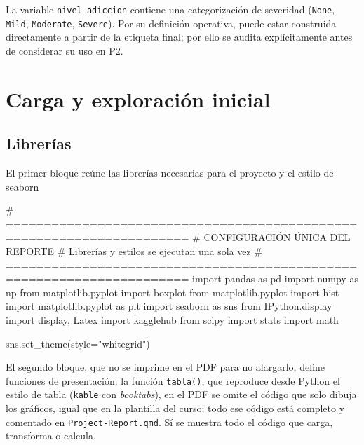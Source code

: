 \documentclass[11pt,spanish,a4paper,]{article}
\newenvironment{Shaded}{\begin{snugshade}}{\end{snugshade}}
\newcommand{\CommentTok}[1]{\textcolor[rgb]{0.37,0.37,0.37}{#1}}
\newcommand{\ImportTok}[1]{\textcolor[rgb]{0.00,0.46,0.62}{#1}}
\newcommand{\NormalTok}[1]{\textcolor[rgb]{0.00,0.23,0.31}{#1}}
\newcommand{\OperatorTok}[1]{\textcolor[rgb]{0.37,0.37,0.37}{#1}}
\newcommand{\StringTok}[1]{\textcolor[rgb]{0.13,0.47,0.30}{#1}}
\begin{document}
La variable \texttt{nivel\_adiccion} contiene una categorización de
severidad (\texttt{None}, \texttt{Mild}, \texttt{Moderate},
\texttt{Severe}). Por su definición operativa, puede estar construida
directamente a partir de la etiqueta final; por ello se audita
explícitamente antes de considerar su uso en P2.

\section{Carga y exploración
inicial}\label{carga-y-exploraciuxf3n-inicial}

\subsection{Librerías}\label{libreruxedas}

El primer bloque reúne las librerías necesarias para el proyecto y el
estilo de seaborn

\protect{}\label{setup}
\begin{Shaded}
\begin{Highlighting}[]
\CommentTok{\# ======================================================================}
\CommentTok{\# CONFIGURACIÓN ÚNICA DEL REPORTE}
\CommentTok{\# Librerías y estilos se ejecutan una sola vez}
\CommentTok{\# ======================================================================}
\ImportTok{import}\NormalTok{ pandas }\ImportTok{as}\NormalTok{ pd}
\ImportTok{import}\NormalTok{ numpy }\ImportTok{as}\NormalTok{ np}
\ImportTok{from}\NormalTok{ matplotlib.pyplot }\ImportTok{import}\NormalTok{ boxplot}
\ImportTok{from}\NormalTok{ matplotlib.pyplot }\ImportTok{import}\NormalTok{ hist}
\ImportTok{import}\NormalTok{ matplotlib.pyplot }\ImportTok{as}\NormalTok{ plt}
\ImportTok{import}\NormalTok{ seaborn }\ImportTok{as}\NormalTok{ sns}
\ImportTok{from}\NormalTok{ IPython.display }\ImportTok{import}\NormalTok{ display, Latex}
\ImportTok{import}\NormalTok{ kagglehub}
\ImportTok{from}\NormalTok{ scipy }\ImportTok{import}\NormalTok{ stats}
\ImportTok{import}\NormalTok{ math}

\NormalTok{sns.set\_theme(style}\OperatorTok{=}\StringTok{"whitegrid"}\NormalTok{)}
\end{Highlighting}
\end{Shaded}

El segundo bloque, que no se imprime en el PDF para no alargarlo, define
funciones de presentación: la función \texttt{tabla()}, que reproduce
desde Python el estilo de tabla (\texttt{kable} con \emph{booktabs}), en
el PDF se omite el código que solo dibuja los gráficos, igual que en la
plantilla del curso; todo ese código está completo y comentado en
\texttt{Project-Report.qmd}. Sí se muestra todo el código que carga,
transforma o calcula.
\end{document}
